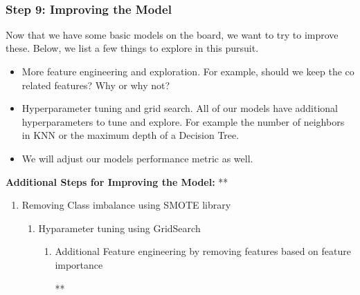 \documentclass[11pt]{article}
\providecommand{\tightlist}{%
      \setlength{\itemsep}{0pt}\setlength{\parskip}{0pt}}
\begin{document}
    \begin{center}
    \end{center}
    { \hspace*{\fill} \\}
    
    \subsubsection{Step 9: Improving the
Model}\label{step-9-improving-the-model}

Now that we have some basic models on the board, we want to try to
improve these. Below, we list a few things to explore in this pursuit.

\begin{itemize}
\tightlist
\item
  More feature engineering and exploration. For example, should we keep
  the co related features? Why or why not?
\item
  Hyperparameter tuning and grid search. All of our models have
  additional hyperparameters to tune and explore. For example the number
  of neighbors in KNN or the maximum depth of a Decision Tree.\\
\item
  We will adjust our models performance metric as well.
\end{itemize}

    \textbf{Additional Steps for Improving the Model:} **

\begin{enumerate}
\def\labelenumi{\arabic{enumi}.}
\tightlist
\item
  Removing Class imbalance using SMOTE library

  \begin{enumerate}
  \def\labelenumii{\arabic{enumii}.}
  \setcounter{enumii}{1}
  \tightlist
  \item
    Hyparameter tuning using GridSearch

    \begin{enumerate}
    \def\labelenumiii{\arabic{enumiii}.}
    \setcounter{enumiii}{2}
    \tightlist
    \item
      Additional Feature engineering by removing features based on
      feature importance

      **
    \end{enumerate}
  \end{enumerate}
\end{enumerate}
\end{document}
